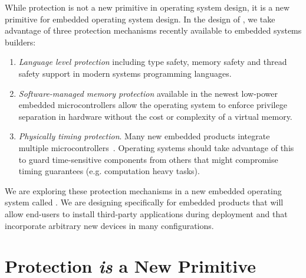 
%

While protection is not a new primitive in operating system design, it is a
new primitive for embedded operating system design. In the design of \name, we
take advantage of three protection mechanisms recently available to embedded
systems builders:

\begin{enumerate}
  \item \emph{Language level protection} including type safety, memory safety
    and thread safety support in modern systems programming languages.
  \item \emph{Software-managed memory protection} available in the newest
    low-power embedded microcontrollers allow the operating system to enforce
    privilege separation in hardware without the cost or complexity of a virtual
    memory.
  \item \emph{Physically timing protection}. Many new embedded products
    integrate multiple microcontrollers~.
  Operating systems should take advantage of this to guard time-sensitive
  components from others that might compromise timing guarantees (e.g.
  computation heavy tasks).
\end{enumerate}

We are exploring these protection mechanisms in a new embedded operating system
called \name. We are designing \name specifically for embedded products that
will allow end-users to install third-party applications during deployment and
that incorporate arbitrary new devices in many configurations.

\section{Protection \emph{is} a New Primitive}

